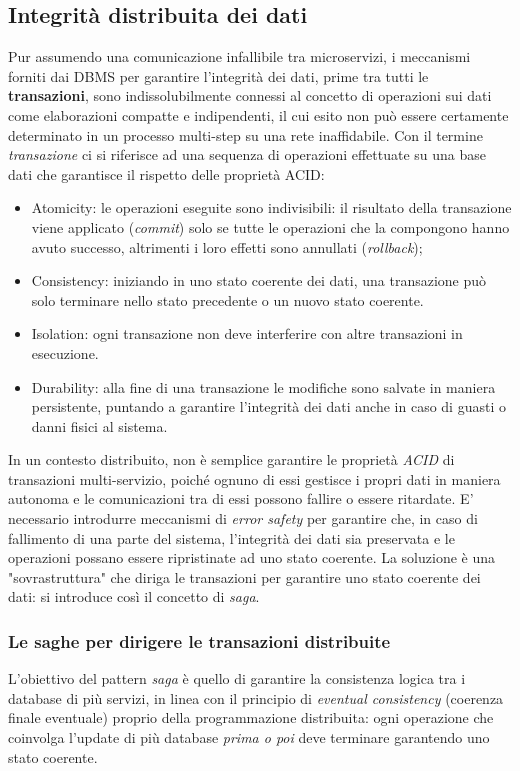 \subsection{Integrità distribuita dei dati}
Pur assumendo una comunicazione infallibile tra microservizi, i meccanismi forniti dai DBMS per garantire l'integrità dei dati, prime tra tutti le \textbf{transazioni}, sono indissolubilmente connessi al concetto di operazioni sui dati come elaborazioni compatte e indipendenti, il cui esito non può essere certamente determinato in un processo multi-step su una rete inaffidabile.
Con il termine \emph{transazione} ci si riferisce ad una sequenza di operazioni effettuate su una base dati che garantisce il rispetto delle proprietà ACID:
\begin{itemize}
    \item Atomicity: le operazioni eseguite sono indivisibili: il risultato della transazione viene applicato (\emph{commit}) solo se tutte le operazioni che la compongono hanno avuto successo, altrimenti i loro effetti sono annullati (\emph{rollback});
    \item Consistency: iniziando in uno stato coerente dei dati, una transazione può solo terminare nello stato precedente o un nuovo stato coerente.
    \item Isolation: ogni transazione non deve interferire con altre transazioni in esecuzione.
    \item Durability: alla fine di una transazione le modifiche sono salvate in maniera persistente, puntando a garantire l'integrità dei dati anche in caso di guasti o danni fisici al sistema.
\end{itemize}

In un contesto distribuito, non è semplice garantire le proprietà \emph{ACID} di transazioni multi-servizio, poiché ognuno di essi gestisce i propri dati in maniera autonoma e le comunicazioni tra di essi possono fallire o essere ritardate. E' necessario introdurre meccanismi di \emph{error safety} per garantire che, in caso di fallimento di una parte del sistema, l'integrità dei dati sia preservata e le operazioni possano essere ripristinate ad uno stato coerente.
La soluzione è una "sovrastruttura" che diriga le transazioni per garantire uno stato coerente dei dati: si introduce così il concetto di \emph{saga}.

\subsubsection{Le saghe per dirigere le transazioni distribuite}
L'obiettivo del pattern \emph{saga} è quello di garantire la consistenza logica tra i database di più servizi, in linea con il principio di \emph{eventual consistency} (coerenza finale eventuale) proprio della programmazione distribuita: ogni operazione che coinvolga l'update di più database \emph{prima o poi} deve terminare garantendo uno stato coerente.

